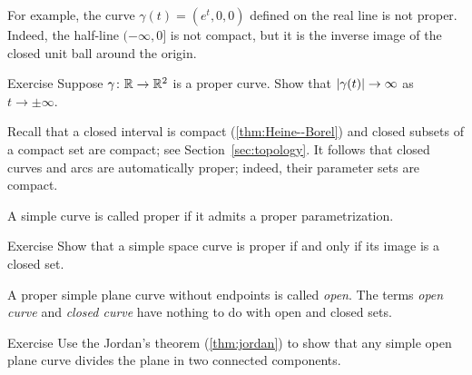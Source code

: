 For example, the curve $\gamma(t)=(e^t,0,0)$ defined on the real line is not proper.
Indeed, the half-line $(-\infty,0]$ is not compact, but it is the inverse image of the closed unit ball around the origin.

\begin{thm}{Exercise}\label{ex:open-curve}
Suppose $\gamma\colon\mathbb{R}\to\mathbb{R}^2$ is a proper curve.
Show that  $|\gamma(t)|\z\to\infty$ as $t\to\pm\infty$.
\end{thm}


Recall that a closed interval is compact (\ref{thm:Heine--Borel}) and closed subsets of a compact set are compact;
see Section~\ref{sec:topology}.
It follows that closed curves and arcs are automatically proper;
indeed, their parameter sets are compact.

A simple curve is called proper if it admits a proper parametrization.

\begin{thm}{Exercise}\label{ex:proper-closed}
Show that a simple space curve is proper if and only if its image is a closed set.

\end{thm}

A proper simple plane curve without endpoints is called \emph{open}.
The terms {}\emph{open curve} and {}\emph{closed curve} have nothing to do with open and closed sets.

\begin{thm}{Exercise}\label{ex:proper-curve}
Use the Jordan's theorem (\ref{thm:jordan}) to show that any simple open plane curve divides the plane in two connected components.  
\end{thm}



